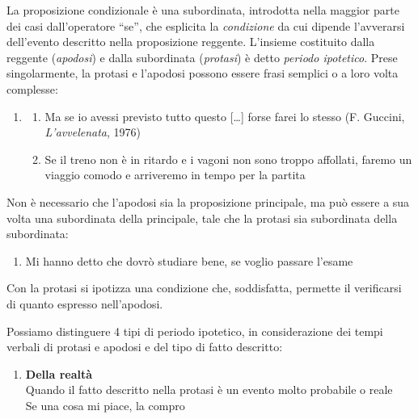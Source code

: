 \documentclass[
  a4paper,
  twoside,
  11pt,
  chapterprefix=false,
  bibliography=totocnumbered,
  listof=flat]{scrbook}
\providecommand{\tightlist}{%
  \setlength{\itemsep}{0pt}\setlength{\parskip}{0pt}}
\begin{document}
La proposizione condizionale è una subordinata, introdotta nella maggior parte dei casi dall'operatore \enquote{se}, che esplicita la \emph{condizione} da cui dipende l'avverarsi dell'evento descritto nella proposizione reggente. L'insieme costituito dalla reggente (\emph{apodosi}) e dalla subordinata (\emph{protasi}) è detto \emph{periodo ipotetico}. Prese singolarmente, la protasi e l'apodosi possono essere frasi semplici o a loro volta complesse:

\begin{enumerate}
\def\labelenumi{(\arabic{enumi})}
\setcounter{enumi}{82}
\item
  \begin{enumerate}
  \def\labelenumii{\alph{enumii}.}
  \tightlist
  \item
    Ma se io avessi previsto tutto questo {[}\ldots{]} forse farei lo stesso (F. Guccini, \emph{L'avvelenata}, 1976)
  \item
    Se il treno non è in ritardo e i vagoni non sono troppo affollati, faremo un viaggio comodo e arriveremo in tempo per la partita
  \end{enumerate}
\end{enumerate}

Non è necessario che l'apodosi sia la proposizione principale, ma può essere a sua volta una subordinata della principale, tale che la protasi sia subordinata della subordinata:

\begin{enumerate}
\def\labelenumi{(\arabic{enumi})}
\setcounter{enumi}{83}
\tightlist
\item
  Mi hanno detto che dovrò studiare bene, se voglio passare l'esame
\end{enumerate}

Con la protasi si ipotizza una condizione che, soddisfatta, permette il verificarsi di quanto espresso nell'apodosi.

Possiamo distinguere 4 tipi di periodo ipotetico, in considerazione dei tempi verbali di protasi e apodosi e del tipo di fatto descritto:

\begin{enumerate}
\def\labelenumi{(\arabic{enumi})}
\setcounter{enumi}{84}
\tightlist
\item
  \textbf{Della realtà}\\
  Quando il fatto descritto nella protasi è un evento molto probabile o reale\\
  Se una cosa mi piace, la compro
\end{enumerate}
\end{document}
